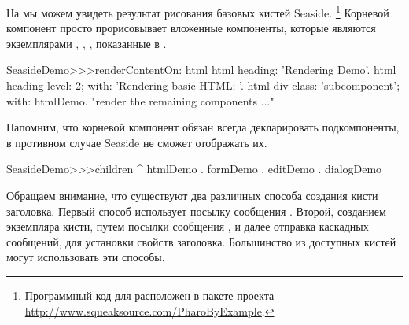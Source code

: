 \documentclass[a4paper,10pt,twoside]{book}
\begin{document}

На  мы можем увидеть результат
рисования базовых кистей Seaside.
\footnote{Программный код для  расположен в пакете
 проекта \url{http://www.squeaksource.com/PharoByExample}.}
Корневой компонент  просто прорисовывает вложенные компоненты,
которые являются экземплярами , ,
, показанные в .

\needspace{7ex}
\begin{method}[renderdemo]{}
SeasideDemo>>>renderContentOn: html
	html heading: 'Rendering Demo'.
	html heading
		level: 2;
		with: 'Rendering basic HTML: '.
	html div
		class: 'subcomponent';
		with: htmlDemo.
	"render the remaining components ..."
\end{method}

\noindent
Напомним,
что корневой компонент обязан всегда декларировать подкомпоненты,
в противном случае Seaside не сможет отображать их.


\begin{code}{}
SeasideDemo>>>children
	^ { htmlDemo . formDemo . editDemo . dialogDemo }
\end{code}


Обращаем внимание, что существуют два различных способа создания кисти заголовка.
Первый способ использует посылку сообщения .
Второй, созданием экземпляра кисти, путем посылки сообщения ,
и далее отправка каскадных сообщений, для установки свойств заголовка.
Большинство из доступных кистей могут использовать эти способы.
\end{document}
